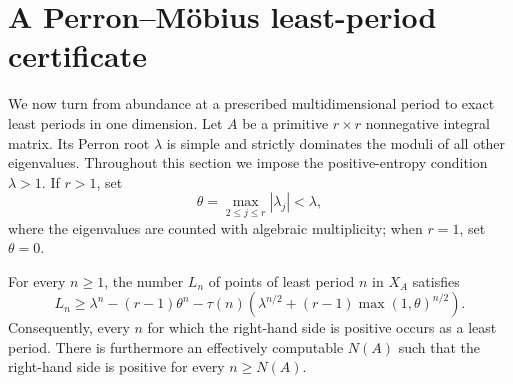 \section{A Perron--M\"obius least-period certificate}
\label{sec:least-period}

We now turn from abundance at a prescribed multidimensional period to exact
least periods in one dimension.  Let $A$ be a primitive $r\times r$
nonnegative integral matrix.  Its Perron root $\lambda$ is simple and
strictly dominates the moduli of all other eigenvalues.  Throughout this
section we impose the positive-entropy condition $\lambda>1$.  If $r>1$, set
\[
 \theta=\max_{2\le j\le r}|\lambda_j|<\lambda,
\]
where the eigenvalues are counted with algebraic multiplicity; when $r=1$,
set $\theta=0$.

\begin{theorem}
\label{thm:least-period}
For every $n\ge1$, the number $L_n$ of points of least period $n$ in $X_A$
satisfies
\begin{equation}
L_n\ge \lambda^n-(r-1)\theta^n
-\tau(n)\left(\lambda^{n/2}
 +(r-1)\max(1,\theta)^{n/2}\right).
\label{eq:least-bound}
\end{equation}
Consequently, every $n$ for which the right-hand side is positive occurs as a
least period.  There is furthermore an effectively computable $N(A)$ such
that the right-hand side is positive for every $n\ge N(A)$.
\end{theorem}

